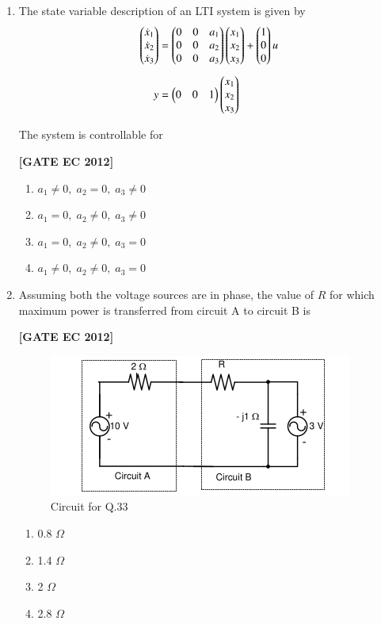 \documentclass[12pt]{article}
\begin{document}
\begin{enumerate}[leftmargin=1.0em, label=\textbf{Q.\arabic*.}, itemsep=2em]
\begin{enumerate}[leftmargin=2.5em, label=\textbf{Q.\arabic*.}, itemsep=2em, start=26]
\item The state variable description of an LTI system is given by
\begin{align*}
\begin{pmatrix}
\dot{x}_1 \\ \dot{x}_2 \\ \dot{x}_3
\end{pmatrix}
&=
\begin{pmatrix}
0 & 0 & a_1 \\
0 & 0 & a_2 \\
0 & 0 & a_3
\end{pmatrix}
\begin{pmatrix}
x_1 \\ x_2 \\ x_3
\end{pmatrix}
+
\begin{pmatrix}
1 \\ 0 \\ 0
\end{pmatrix} u
\\[0.5em]
y &=
\begin{pmatrix}
0 & 0 & 1
\end{pmatrix}
\begin{pmatrix}
x_1 \\ x_2 \\ x_3
\end{pmatrix}
\end{align*}

The system is controllable for

\noindent \textbf{[GATE EC 2012]}
\begin{multicols}{2}
    \begin{enumerate}
        \item $a_1 \neq 0, \; a_2 = 0, \; a_3 \neq 0$
        \item $a_1 = 0, \; a_2 \neq 0, \; a_3 \neq 0$
        \item $a_1 = 0, \; a_2 \neq 0, \; a_3 = 0$
        \item $a_1 \neq 0, \; a_2 \neq 0, \; a_3 = 0$
    \end{enumerate}
\end{multicols}

\item Assuming both the voltage sources are in phase, the value of $R$ for which maximum power is transferred from circuit A to circuit B is

\noindent \textbf{[GATE EC 2012]}
\begin{figure}[H]\centering
\includegraphics[width=0.5\columnwidth]{figs/q33.png}
\caption{Circuit for Q.33}
\label{fig:q33}
\end{figure}
\begin{multicols}{2}
    \begin{enumerate}
        \item 0.8 $\Omega$
        \item 1.4 $\Omega$
        \item 2 $\Omega$
        \item 2.8 $\Omega$
    \end{enumerate}
\end{multicols}


\end{enumerate}
\end{enumerate}
\end{document}
